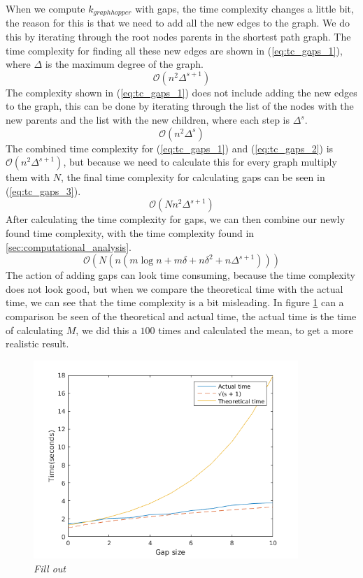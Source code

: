 \documentclass{article}
\begin{document}
When we compute $k_{graphhopper}$ with gaps, the time complexity changes a little bit, the reason for this is that we need to add all the new edges to the graph. We do this by iterating through the root nodes parents in the shortest path graph. The time complexity for finding all these new edges are shown in (\ref{eq:tc_gaps_1}), where $\Delta$ is the maximum degree of the graph.
\begin{equation}
\label{eq:tc_gaps_1}
\mathcal{O}\left(n^2 \Delta^{s + 1}\right)
\end{equation}
The complexity shown in (\ref{eq:tc_gaps_1}) does not include adding the new edges to the graph, this can be done by iterating through the list of the nodes with the new parents and the list with the new children, where each step is $\Delta^s$.
\begin{equation}
\label{eq:tc_gaps_2}
\mathcal{O}\left(n^2 \Delta^{s}\right)
\end{equation}
The combined time complexity for (\ref{eq:tc_gaps_1}) and (\ref{eq:tc_gaps_2}) is $\mathcal{O}\left(n^2 \Delta^{s + 1}\right)$, but because we need to calculate this for every graph multiply them with $N$, the final time complexity for calculating gaps can be seen in (\ref{eq:tc_gaps_3}).
\begin{equation}
\label{eq:tc_gaps_3}
\mathcal{O}\left(N n^2 \Delta^{s + 1}\right)
\end{equation}
After calculating the time complexity for gaps, we can then combine our newly found time complexity, with the time complexity found in \ref{sec:computational_analysis}.
\begin{equation}
\mathcal{O}\left(N\left(n\left(m\log n + m\delta + n\delta^2 + n\Delta^{s + 1}\right)\right)\right)
\end{equation}
The action of adding gaps can look time consuming, because the time complexity does not look good, but when we compare the theoretical time with the actual time, we can see that the time complexity is a bit misleading. In figure \ref{fig:time_complexity_gaps} can a comparison be seen of the theoretical and actual time, the actual time is the time of calculating $M$, we did this a $100$ times and calculated the mean, to get a more realistic result.
\begin{figure}[H]
	\centering
	\includegraphics[width=10cm]{time_complexity_gaps}
	\caption{\textit{Fill out}}
	\label{fig:time_complexity_gaps}
\end{figure}
\end{document}
